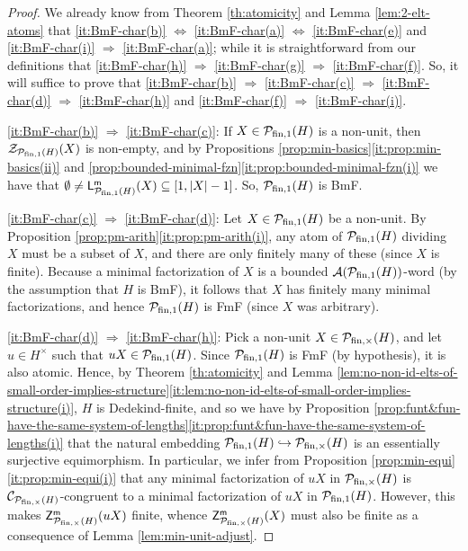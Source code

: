\begin{proof}
	We already know from Theorem \ref{th:atomicity} and Lemma \ref{lem:2-elt-atoms} that \ref{it:BmF-char(b)} $\Leftrightarrow$ \ref{it:BmF-char(a)} $\Leftrightarrow$ \ref{it:BmF-char(e)} and \ref{it:BmF-char(i)} $\Rightarrow$ \ref{it:BmF-char(a)}; while it is straightforward from our definitions that \ref{it:BmF-char(h)} $\Rightarrow$ \ref{it:BmF-char(g)} $\Rightarrow$ \ref{it:BmF-char(f)}. So, it will suffice to prove that \ref{it:BmF-char(b)}
	$\Rightarrow$ \ref{it:BmF-char(c)} $\Rightarrow$ \ref{it:BmF-char(d)} $\Rightarrow$ \ref{it:BmF-char(h)}
 and \ref{it:BmF-char(f)} $\Rightarrow$
	\ref{it:BmF-char(i)}.
	
	\ref{it:BmF-char(b)} $\Rightarrow$ \ref{it:BmF-char(c)}: If $X \in \mathcal P_{\textrm{fin}, 1}(H)$ is a non-unit, then $\mathcal{Z}_{\mathcal P_{\textrm{fin}, 1}(H)}(X)$ is non-empty, and by Propositions \ref{prop:min-basics}\ref{it:prop:min-basics(ii)} and \ref{prop:bounded-minimal-fzn}\ref{it:prop:bounded-minimal-fzn(i)} we have that $\emptyset \ne \mathsf{L}_{\mathcal P_{\textrm{fin}, 1}(H)}^{\mathsf{m}}(X) \subseteq [ 1, |X|-1]$. So, $\mathcal P_{\textrm{fin}, 1}(H)$ is BmF.
	
	\ref{it:BmF-char(c)} $\Rightarrow$ \ref{it:BmF-char(d)}: Let $X \in \mathcal P_{\textrm{fin}, 1}(H)$ be a non-unit. 
	By Proposition \ref{prop:pm-arith}\ref{it:prop:pm-arith(i)}, any atom of $\mathcal P_{\textrm{fin}, 1}(H)$ dividing $X$ must be a subset of $X$, and there are only finitely many of these (since $X$ is finite).
	Because a minimal factorization of $X$ is a bounded $\mathcal{A}(\mathcal P_{\textrm{fin}, 1}(H))$-word (by the assumption that $H$ is BmF), it follows that $X$ has finitely many minimal factorizations, and hence $\mathcal P_{\textrm{fin}, 1}(H)$ is FmF (since $X$ was arbitrary).
	
	\ref{it:BmF-char(d)} $\Rightarrow$ \ref{it:BmF-char(h)}: Pick a non-unit $X \in \mathcal P_{\textrm{fin},\times}(H)$, and let $u \in H^\times$ such that $uX \in \mathcal P_{\textrm{fin},1}(H)$. Since $\mathcal P_{\textrm{fin},1}(H)$ is FmF (by hypothesis), it is also atomic. Hence, by Theorem \ref{th:atomicity} and Lemma \ref{lem:no-non-id-elts-of-small-order-implies-structure}\ref{it:lem:no-non-id-elts-of-small-order-implies-structure(i)}, $H$ is Dedekind-finite, and so we have by Proposition \ref{prop:funt&fun-have-the-same-system-of-lengths}\ref{it:prop:funt&fun-have-the-same-system-of-lengths(i)} that the natural embedding $\mathcal P_{\textrm{fin},1}(H) \hookrightarrow \mathcal P_{\textrm{fin},\times}(H)$ is an essentially surjective equimorphism.  
	In particular, we infer from Proposition \ref{prop:min-equi}\ref{it:prop:min-equi(i)} that any minimal factorization of $uX$ in $\mathcal P_{\textrm{fin},\times}(H)$ is $\mathcal{C}_{\mathcal P_{\textrm{fin},\times}(H)}$-congruent to a minimal factorization of $uX$ in $\mathcal P_{\textrm{fin},1}(H)$.
	However, this makes $\mathsf{Z}_{\mathcal P_{\textrm{fin},\times}(H)}^{\mathsf{m}}(uX)$ finite, whence $\mathsf{Z}_{\mathcal P_{\textrm{fin},\times}(H)}^{\mathsf{m}}(X)$ must also be finite as a consequence of Lemma \ref{lem:min-unit-adjust}.
	

\end{proof}
